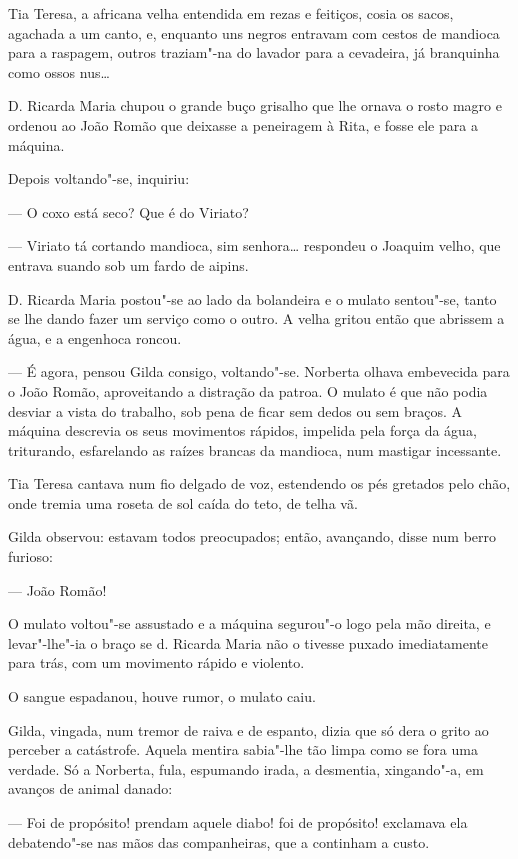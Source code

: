 Tia Teresa, a africana velha entendida em rezas e feitiços, cosia os
sacos, agachada a um canto, e, enquanto uns negros entravam com cestos
de mandioca para a raspagem, outros traziam"-na do lavador para a
cevadeira, já branquinha como ossos nus\ldots{}

D. Ricarda Maria chupou o grande buço grisalho que lhe ornava o rosto
magro e ordenou ao João Romão que deixasse a peneiragem à Rita, e fosse
ele para a máquina.

Depois voltando"-se, inquiriu:

--- O coxo está seco? Que é do Viriato?

--- Viriato tá cortando mandioca, sim senhora\ldots{} respondeu o Joaquim
velho, que entrava suando sob um fardo de aipins.

D. Ricarda Maria postou"-se ao lado da bolandeira e o mulato sentou"-se,
tanto se lhe dando fazer um serviço como o outro. A velha gritou então
que abrissem a água, e a engenhoca roncou.

--- É agora, pensou Gilda consigo, voltando"-se. Norberta olhava
embevecida para o João Romão, aproveitando a distração da patroa. O
mulato é que não podia desviar a vista do trabalho, sob pena de ficar
sem dedos ou sem braços. A máquina descrevia os seus movimentos rápidos,
impelida pela força da água, triturando, esfarelando as raízes brancas
da mandioca, num mastigar incessante.

Tia Teresa cantava num fio delgado de voz, estendendo os pés gretados
pelo chão, onde tremia uma roseta de sol caída do teto, de telha vã.

Gilda observou: estavam todos preocupados; então, avançando, disse num
berro furioso:

--- João Romão!

O mulato voltou"-se assustado e a máquina segurou"-o logo pela mão
direita, e levar"-lhe"-ia o braço se d. Ricarda Maria não o tivesse puxado
imediatamente para trás, com um movimento rápido e violento.

O sangue espadanou, houve rumor, o mulato caiu.

Gilda, vingada, num tremor de raiva e de espanto, dizia que só dera o
grito ao perceber a catástrofe. Aquela mentira sabia"-lhe tão limpa como
se fora uma verdade. Só a Norberta, fula, espumando irada, a desmentia,
xingando"-a, em avanços de animal danado:

--- Foi de propósito! prendam aquele diabo! foi de propósito! exclamava
ela debatendo"-se nas mãos das companheiras, que a continham a custo.

